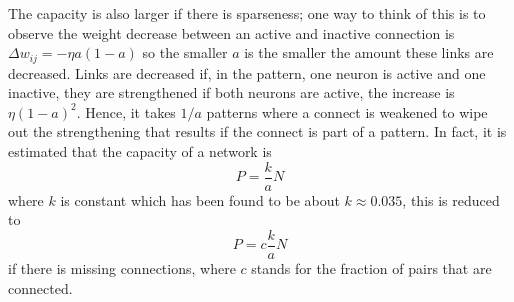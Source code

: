\documentclass[11pt,a4paper]{scrartcl}
\begin{document}
The capacity is also larger if there is sparseness; one way to think
of this is to observe the weight decrease between an active and
inactive connection is $\Delta w_{ij}=-\eta a (1-a)$ so the smaller
$a$ is the smaller the amount these links are decreased. Links are
decreased if, in the pattern, one neuron is active and one inactive,
they are strengthened if both neurons are active, the increase is
$\eta (1-a)^2$. Hence, it takes $1/a$ patterns where a connect is
weakened to wipe out the strengthening that results if the connect is
part of a pattern. In fact, it is estimated that the capacity of a
network is
\begin{equation}
P=\frac{k}{a}N
\end{equation}
where $k$ is constant which has been found to be about $k\approx
0.035$, this is reduced to 
\begin{equation}
P=c\frac{k}{a}N
\end{equation}
if there is missing connections, where $c$ stands for the fraction of pairs that are connected.
\end{document}

